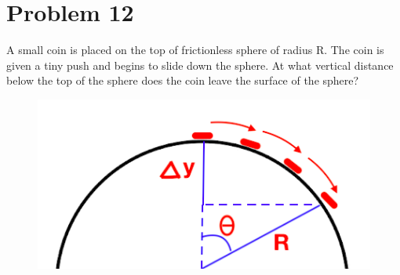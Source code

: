 \documentclass{article}
\begin{document}
\section*{Problem 12} 
A small coin is placed on the top of frictionless sphere of radius R. The coin is given a tiny push and begins to slide down the sphere. At what vertical distance below the top of the sphere does the coin leave the surface of the sphere?
\begin{figure}[h]
	\includegraphics[scale=0.35]{P12}
	\centering
\end{figure}
\end{document}
